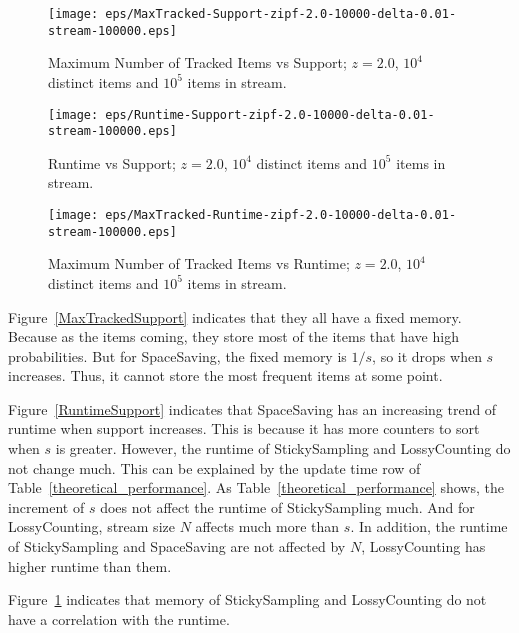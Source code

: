 \documentclass[10pt]{article}
\begin{document}
\begin{figure}[H]
      \begin{minipage}{0.48\textwidth}
        \centering
        \texttt{[image: eps/MaxTracked-Support-zipf-2.0-10000-delta-0.01-stream-100000.eps]}
        \caption{Maximum Number of Tracked Items vs Support; $z=2.0$, $10^4$ distinct items and $10^5$ items in stream.}
        \label{MaxTrackedSupport}
      \end{minipage}\hfill
      \begin{minipage}{0.48\textwidth}
        \centering
        \texttt{[image: eps/Runtime-Support-zipf-2.0-10000-delta-0.01-stream-100000.eps]}
        \caption{Runtime vs Support; $z=2.0$, $10^4$ distinct items and $10^5$ items in stream.}
        \label{RuntimeSupport}
      \end{minipage}
      \centering
      \begin{minipage}{0.48\textwidth}
        \centering
        \texttt{[image: eps/MaxTracked-Runtime-zipf-2.0-10000-delta-0.01-stream-100000.eps]}
        \caption{Maximum Number of Tracked Items vs Runtime; $z=2.0$, $10^4$ distinct items and $10^5$ items in stream.}
        \label{MaxTrackedRuntime}
      \end{minipage}
\end{figure}
Figure~\ref{MaxTrackedSupport} indicates that they all have a fixed memory.
Because as the items coming, they store most of the items that have high probabilities.
But for SpaceSaving, the fixed memory is $1/s$, so it drops when $s$ increases. 
Thus, it cannot store the most frequent items at some point. 

Figure~\ref{RuntimeSupport} indicates that SpaceSaving has an increasing trend of runtime when
support increases. This is because it has more counters to sort when $s$ is greater.
However, the runtime of StickySampling and LossyCounting do not change much.
This can be explained by the update time row of Table~\ref{theoretical_performance}.
As Table~\ref{theoretical_performance} shows, the increment of $s$ does not affect the runtime of StickySampling much. And for LossyCounting, stream size $N$
affects much more than $s$. In addition, the runtime of StickySampling and SpaceSaving are not affected by $N$, 
LossyCounting has higher runtime than them.

Figure~\ref{MaxTrackedRuntime} indicates that memory of StickySampling and LossyCounting
do not have a correlation with the runtime. 
\end{document}
